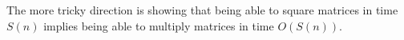 \documentclass{article}
\begin{document}
The more tricky direction is showing that being able to square matrices in time $S(n)$ implies being able to multiply matrices in time $O(S(n))$. \begin{comment}
This can be done with a trick smelling faintly of Karatsuba's algorithm (see problem 30-1). Suppose that we wanted to multiply matrices A and B. Then, we have that
\[
(A+B)^2 = A^2 + AB +BA + B^2
\]
So,
\[
AB+BA = (A+B)^2 -A^2 -B^2
\]
and so, can be computed in time $3S(n)$. So, in time $O(S(n))$ we can compute $AB$ given $BA$. Now, we consider dividing up the matrix into four equal parts, each of which are $n/2 \times n/2$ matrices.
\[
A = \left(\begin{array}{cc} A_{11}&A_{12}\\A_{21}&A_{22}\end{array}\right)
\]
and
\[
B = \left(\begin{array}{cc} B_{11}&B_{12}\\B_{21}&B_{22}\end{array}\right)
\]
Then, our end goal will be to compute the four following expressions
\begin{align*}
A_{11}B_{11} + A_{12}B_{21}\\
A_{11}B_{12} + A_{12}B_{22}\\
A_{21}B_{11} + A_{22}B_{21}\\
A_{21}B_{12} + A_{22}B_{22}\\
\end{align*}
Then, since we can compute $AB + BA$, we can look at the four entries of that to know that we can compute The following four expressions
\begin{align*}
A_{11}B_{11} + A_{12}B_{21} + B_{11}A_{11} + B_{12}A_{21}\\
A_{11}B_{12} + A_{12}B_{22} + B_{11}A_{12} + B_{12}A_{22}\\
A_{21}B_{11} + A_{22}B_{21} + B_{21}A_{11} + B_{22}A_{21}\\
A_{21}B_{12} + A_{22}B_{22} + B_{21}A_{12} + B_{22}A_{22}\\
\end{align*}
However, since we can compute the sum of each of these products summed with the multiplication in the other order. That is, we replace $B_{ij}A_{pq}$ with $A_{pq}B_{ij} +A_{pq}^2 + B_{ij}^2 -(A_{pq} + B_{ij})^2$. Since the last three terms are things we can compute with our squaring algorithm, we know the values of the following expressions:
\begin{align*}
A_{11}B_{11} + A_{12}B_{21} + A_{11}B_{11} + A_{21}B_{12}\\
A_{11}B_{12} + A_{12}B_{22} + A_{12}B_{11} + A_{22}B_{12}\\
A_{21}B_{11} + A_{22}B_{21} + A_{11}B_{21} + A_{21}B_{22}\\
A_{21}B_{12} + A_{22}B_{22} + A_{12}B_{21} + A_{22}B_{22}\\
\end{align*}
\end{comment}
\end{document}
